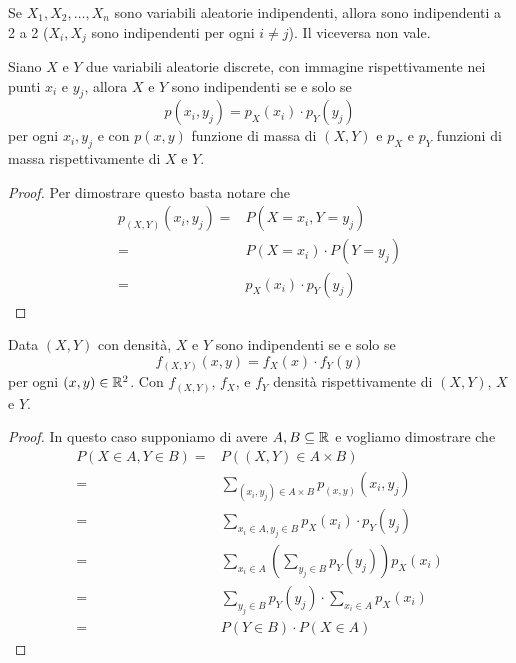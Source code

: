 \begin{observation}
	Se $X_1, X_2, \dots, X_n$ sono variabili aleatorie indipendenti, allora sono indipendenti a 2
	a 2 ($X_i, X_j$ sono indipendenti per ogni $i \neq j$). Il viceversa non vale.
\end{observation}

\begin{proposition}
	Siano $X$ e $Y$ due variabili aleatorie discrete, con immagine rispettivamente nei punti $x_i$
	e $y_j$, allora $X$ e $Y$ sono indipendenti se e solo se
	\[ p(x_i, y_j) = p_X (x_i) \cdot p_Y (y_j) \]
	per ogni $x_i, y_j$ e con $p(x,y)$ funzione di massa di $(X, Y)$ e $p_X$ e $p_Y$ funzioni di
	massa rispettivamente di $X$ e $Y$.
	\begin{proof}
		Per dimostrare questo basta notare che
		\begin{align*}
			p_{(X,Y)} (x_i, y_j) = & P(X = x_i, Y = y_j)         \\
			=                      & P(X = x_i) \cdot P(Y = y_j) \\
			=                      & p_X (x_i) \cdot p_Y (y_j)
		\end{align*}
	\end{proof}

	Data $(X, Y)$ con densità, $X$ e $Y$ sono indipendenti se e solo se
	\[ f_{(X,Y)} (x,y) = f_X (x) \cdot f_Y (y) \]
	per ogni $(x, y) \in \mathbb{R}^2$. Con $f_{(X,Y)}$, $f_X$, e $f_Y$ densità rispettivamente di
	$(X,Y)$, $X$ e $Y$.
	\begin{proof}
		In questo caso supponiamo di avere $A, B \subseteq \mathbb{R}$ e vogliamo dimostrare che
		\begin{align*}
			P(X \in A, Y \in B) = & P((X,Y) \in A \times B)                                    \\
			=                     & \sum_{(x_i, y_j) \in A \times B} p_{(x,y)} (x_i, y_j)      \\
			=                     & \sum_{x_i \in A, y_j \in B} p_X(x_i) \cdot p_Y(y_j)        \\
			=                     & \sum_{x_i \in A} \left( \sum_{y_j \in B} p_Y(y_j) \right)
			p_X(x_i)                                                                           \\
			=                     & \sum_{y_j \in B} p_Y(y_j) \cdot \sum_{x_i \in A} p_X (x_i) \\
			=                     & P(Y \in B) \cdot P(X \in A)
		\end{align*}
	\end{proof}
\end{proposition}

